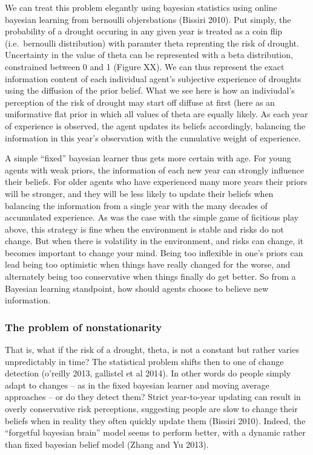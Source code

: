 \documentclass[smallextended]{svjour3}       %
\begin{document}
We can treat this problem elegantly using bayesian statistics using
online bayesian learning from bernoulli objersbations (Bissiri 2010).
Put simply, the probability of a drought occuring in any given year is
treated as a coin flip (i.e.~bernoulli distribution) with paramter theta
reprenting the risk of drought. Uncertainty in the value of theta can be
represented with a beta distribution, constrained between 0 and 1
(Figure XX). We can thus represent the exact information content of each
individual agent's subjective experience of droughts using the diffusion
of the prior belief. What we see here is how an indiviudal's perception
of the risk of drought may start off diffuse at first (here as an
uniformative flat prior in which all values of theta are equally likely.
As each year of experience is observed, the agent updates its beliefs
accordingly, balancing the information in this year's observation with
the cumulative weight of experience.

A simple ``fixed'' bayesian learner thus gets more certain with age. For
young agents with weak priors, the information of each new year can
strongly influence their beliefs. For older agents who have experienced
many more years their priors will be stronger, and they will be less
likely to update their beliefs when balancing the information from a
single year with the many decades of accumulated experience. As was the
case with the simple game of ficitious play above, this strategy is fine
when the environment is stable and risks do not change. But when there
is volatility in the environment, and risks can change, it becomes
important to change your mind. Being too inflexible in one's priors can
lead being too optimistic when things have really changed for the worse,
and alternately being too conservative when things finally do get
better. So from a Bayesian learning standpoint, how should agents choose
to believe new information.

\hypertarget{the-problem-of-nonstationarity}{%
\subsubsection{The problem of
nonstationarity}\label{the-problem-of-nonstationarity}}

That is, what if the risk of a drought, theta, is not a constant but
rather varies unpredictably in time? The statistical problem shifts then
to one of change detection (o'reilly 2013, gallistel et al 2014). In
other words do people simply adapt to changes -- as in the fixed
bayesian learner and moving average approaches -- or do they detect
them? Strict year-to-year updating can result in overly conservative
risk perceptions, suggesting people are slow to change their beliefs
when in reality they often quickly update them (Bissiri 2010). Indeed,
the ``forgetful bayesian brain'' model seems to perform better, with a
dynamic rather than fixed bayesian belief model (Zhang and Yu 2013).
\end{document}
